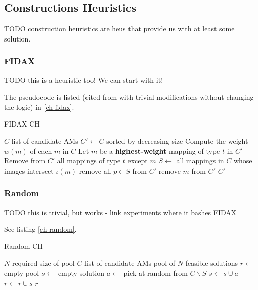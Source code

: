 \documentclass[a4paper,12pt,oneside]{report}
\begin{document}
\subsection{Constructions Heuristics}

TODO construction heuristics are heus that provide us with at least some solution.

\subsubsection{FIDAX}

TODO this is a heuristic too! We can start with it!

The pseudocode is listed (cited from \cite{fidax} with trivial modifications without changing the logic) in \ref{ch-fidax}.

\begin{algorithm}
\caption{FIDAX CH}
\label{ch-fidax}
\begin{algorithmic}
\REQUIRE $C$ list of candidate AMs
\STATE $C' \gets C$ sorted by decreasing size
\STATE Compute the weight $w(m)$ of each $m$ in $C$
  \STATE Let $m$ be a \textbf{highest-weight} mapping of type $t$ in $C'$
  \STATE Remove from $C'$ all mappings of type $t$ except $m$
\ENDFOR
{}
  \STATE $S \gets$ all mappings in $C$ whose images intersect $\iota(m)$
    \STATE remove all $p \in S$ from $C'$
  \ELSE
    \STATE remove $m$ from $C'$
  \ENDIF
\ENDFOR
\RETURN $C'$
\end{algorithmic}
\end{algorithm}

\subsubsection{Random}

TODO this is trivial, but works - link experiments where it bashes FIDAX

See listing \ref{ch-random}.

\begin{algorithm}
\caption{Random CH}
\label{ch-random}
\begin{algorithmic}
\REQUIRE $N$ required size of pool
\REQUIRE $C$ list of candidate AMs
\ENSURE pool of $N$ feasible solutions
\STATE $r \gets $ empty pool
  \STATE {}
  \STATE $s \gets $ empty solution
    \STATE $a \gets $ pick at random from $C \backslash S$
    \STATE $s \gets s \cup a$
  \ENDWHILE
  \STATE $r \gets r \cup s$
\ENDFOR
\RETURN $r$
\end{algorithmic}
\end{algorithm}
\end{document}
